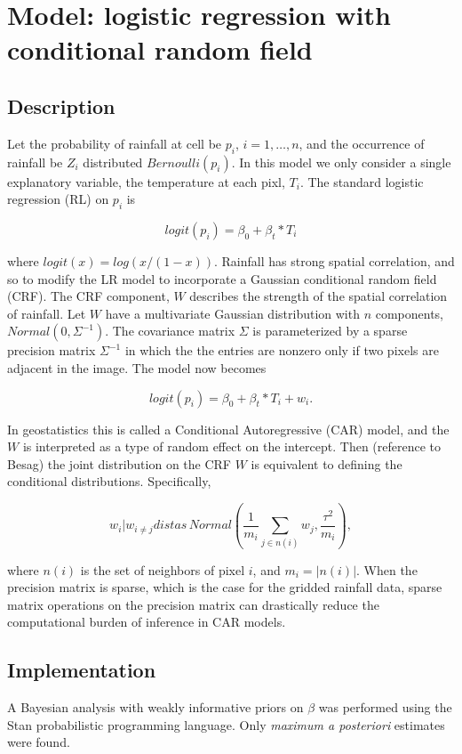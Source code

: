 

\section{Model: logistic regression with conditional random field}

\subsection{Description}
Let the probability of rainfall at cell be $p_i$, $i=1,\ldots,n$, and the occurrence of rainfall be $Z_i$ distributed $Bernoulli(p_i)$. In this model we only consider a single explanatory variable, the temperature at each pixl, $T_i$. The standard logistic regression (RL) on $p_i$ is

$$
logit(p_i) = \beta_0 + \beta_t * T_i
$$

where $logit(x)=log(x/(1-x))$. Rainfall has strong spatial correlation, and so to modify the LR model to incorporate a Gaussian conditional random field (CRF). The CRF component, $W$ describes the strength of the spatial correlation of rainfall. Let $W$ have a multivariate Gaussian distribution with $n$ components, $Normal(0, \Sigma^{-1})$. The covariance matrix $\Sigma$ is parameterized by a sparse precision matrix $\Sigma^{-1}$ in which the the entries are nonzero only if two pixels are adjacent in the image. The model now becomes

$$
logit(p_i) = \beta_0 + \beta_t * T_i + w_i.
$$

In geostatistics this is called a Conditional Autoregressive (CAR) model, and the $W$ is interpreted as a type of random effect on the intercept. Then (reference to Besag) the joint distribution on the CRF $W$ is equivalent to defining the conditional distributions. Specifically,

$$
w_i | w_{i \neq j} distas \, Normal\left( \frac{1}{m_i} \sum_{j \in n(i)} w_j, \frac{\tau^2}{m_i} \right),
$$

where $n(i)$ is the set of neighbors of pixel $i$, and $m_i=|n(i)|$. When the precision matrix is sparse, which is the case for the gridded rainfall data, sparse matrix operations on the precision matrix can drastically reduce the computational burden of inference in CAR models.

\subsection{Implementation}
A Bayesian analysis with weakly informative priors on $\beta$ was performed using the Stan probabilistic programming language. Only \emph{maximum a posteriori} estimates were found.



